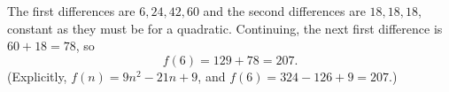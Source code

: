 The first differences are $6,24,42,60$ and the second differences are $18,18,18$, constant as they must be for a quadratic. Continuing, the next first difference is $60+18=78$, so
\[
f(6)=129+78=\boxed{207}.
\]
(Explicitly, $f(n)=9n^2-21n+9$, and $f(6)=324-126+9=207$.)
